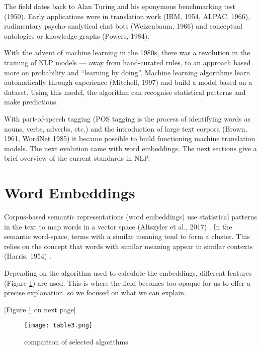 \documentclass[12pt, usenames, dvipsnames]{report}
\begin{document}
\begin{flushleft}
The field dates back to Alan Turing and his eponymous benchmarking test (1950)\cite{turing1950}.
Early applications were in translation work (IBM, 1954, ALPAC, 1966)\cite{hutchins2004}\cite{committee1966language}, rudimentary psycho-analytical chat bots (Weizenbaum, 1966)\cite{weizenbaum1966} and conceptual ontologies or knowledge graphs (Powers, 1984)\cite{powers1984}.

With the advent of machine learning in the 1980s, there was a revolution in the training of NLP models --- away from hand-curated rules, to an approach based more on probability and “learning by doing”. Machine learning algorithms learn automatically through experience (Mitchell, 1997) \cite{mitchell1997} and build a model based on a dataset.
Using this model, the algorithm can recognise statistical patterns and make predictions.

With part-of-speech tagging (POS tagging is the process of identifying words as nouns, verbs, adverbs, etc.) and the introduction of large text corpora (Brown, 1961, WordNet 1985) \cite{brown1979} \cite{wordnet1995} it became possible to build functioning machine translation models.
The next evolution came with word embeddings.
The next sections give a brief overview of the current standards in NLP.


\section{Word Embeddings}

Corpus-based semantic representations (word embeddings) use statistical patterns in the text to map words in a vector space (Altszyler et al., 2017) \cite{altszyler2017}.
In the semantic word-space, terms with a similar meaning tend to form a cluster.
This relies on the concept that words with similar meaning appear in similar contexts (Harris, 1954) \cite{harris1954}.

Depending on the algorithm used to calculate the embeddings, different features (Figure \ref{fig:table3}) are used.
This is where the field becomes too opaque for us to offer a precise explanation, so we focused on what we can explain.

[Figure \ref{fig:table3} on next page]

\vspace*{1.2em}
\begin{figure}[!htbp]
  \hspace*{-3.666em}
  \texttt{[image: table3.png]}
  \caption{comparison of selected algorithms}
  \label{fig:table3}
\end{figure}
\vspace*{1.2em}


\end{flushleft}
\end{document}
